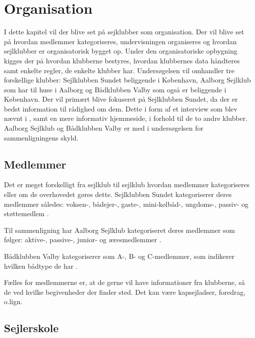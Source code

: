 \chapter{Organisation}\label{chap:organisation}

I dette kapitel vil der blive set på sejklubber som organisation. Der vil blive set på hvordan medlemmer kategoriseres,
undervisningen organiseres og hvordan sejlklubber er organisatorisk bygget op. Under den organisatoriske opbygning
kigges der på hvordan klubberne bestyres, hvordan klubbernes data håndteres samt enkelte regler, de enkelte klubber har.
Undersøgelsen vil omhandler tre forskellige klubber: Sejlklubben Sundet beliggende i København, Aalborg Sejlklub som har
til huse i Aalborg og Bådklubben Valby som også er beliggende i København. Der vil primært blive fokuseret på
Sejlklubben Sundet, da der er bedst information til rådighed om dem. Dette i form af et interview som blev nævnt i
, samt en mere informativ hjemmeside, i forhold til de to andre klubber.
Aalborg Sejlklub og Bådklubben Valby er med i undersøgelsen for sammenligningens skyld.


\section{Medlemmer}\label{sec:organisation-medlemmer}

Det er meget forskelligt fra sejlklub til sejlklub hvordan medlemmer kategoriseres eller om de overhovedet gøres dette.
Sejlklubben Sundet kategoriserer deres medlemmer således: voksen-, bådejer-, gaste-, mini-kølbåd-, ungdoms-, passiv- og
støttemedlem \citep{sundet_vedtaegter}.

Til sammenligning har Aalborg Sejlklub kategoriseret deres medlemmer som følger: aktive-, passive-, junior- og
æresmedlemmer \citep{aalborg_sejlklub_vedtaegter}.

Bådklubben Valby kategoriserer som A-, B- og C-medlemmer, som indikerer hvilken bådtype de har
\citep{badklubben_valby_love}.

Fælles for medlemmerne er, at de gerne vil have informationer fra klubberne, så de ved hvilke begivenheder der finder
sted. Det kan være kapsejladser, foredrag, o.lign.


\section{Sejlerskole}\label{sec:sejlerskole}

